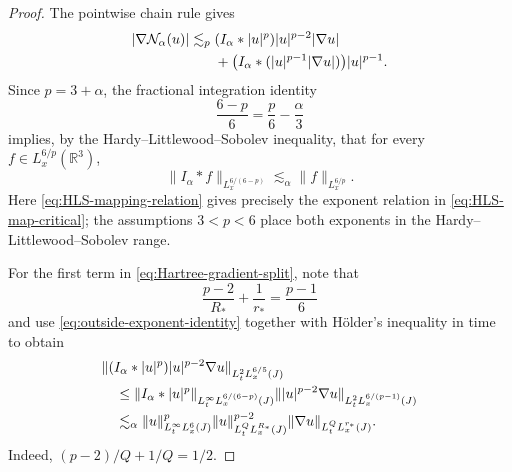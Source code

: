 \documentclass[preprint,12pt]{elsarticle}
\numberwithin{equation}{section}
\theoremstyle{remark}
\newcommand{\R}{\mathbb R}
\newcommand{\Ncal}{\mathcal N_{\alpha}}
\begin{document}
\begin{proof}
The pointwise chain rule gives
\begin{align}
  |\nabla\Ncal(u)|
  \lesssim_p{}&
  (I_\alpha*|u|^p)|u|^{p-2}|\nabla u|\notag\\
  &+\bigl(I_\alpha*(|u|^{p-1}|\nabla u|)\bigr)|u|^{p-1}.
  \label{eq:Hartree-gradient-split}
\end{align}
Since $p=3+\alpha$, the fractional integration identity
\begin{equation}\label{eq:HLS-mapping-relation}
  \frac{6-p}{6}=\frac p6-\frac\alpha3
\end{equation}
implies, by the Hardy--Littlewood--Sobolev inequality, that for every $f\in L_x^{6/p}(\R^3)$,
\begin{equation}\label{eq:HLS-map-critical}
  \|I_\alpha*f\|_{L_x^{6/(6-p)}}
  \lesssim_\alpha \|f\|_{L_x^{6/p}}.
\end{equation}
Here \eqref{eq:HLS-mapping-relation} gives precisely the exponent relation in \eqref{eq:HLS-map-critical}; the assumptions $3<p<6$ place both exponents in the Hardy--Littlewood--Sobolev range.

For the first term in \eqref{eq:Hartree-gradient-split}, note that
\begin{equation}\label{eq:outside-exponent-identity}
  \frac{p-2}{R_*}+\frac1{r_*}=\frac{p-1}{6}
\end{equation}
and use \eqref{eq:outside-exponent-identity} together with H\"older's inequality in time to obtain
\begin{align}
 &\|(I_\alpha*|u|^p)|u|^{p-2}\nabla u\|_{L_t^2L_x^{6/5}(J)}\notag\\
 &\quad\le
 \|I_\alpha*|u|^p\|_{L_t^\infty L_x^{6/(6-p)}(J)}
 \||u|^{p-2}\nabla u\|_{L_t^2L_x^{6/(p-1)}(J)}\notag\\
 &\quad\lesssim_\alpha
 \|u\|_{L_t^\infty L_x^6(J)}^p
 \|u\|_{L_t^Q L_x^{R_*}(J)}^{p-2}
 \|\nabla u\|_{L_t^Q L_x^{r_*}(J)}.
 \label{eq:first-gradient-term}
\end{align}
Indeed, $(p-2)/Q+1/Q=1/2$.


\end{proof}
\end{document}
